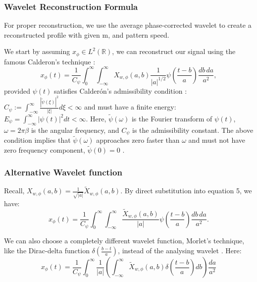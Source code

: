 \documentclass[conference]{IEEEtran}
\begin{document}
\subsubsection{Wavelet Reconstruction Formula}
For proper reconstruction, we use the average phase-corrected wavelet to create a reconstructed profile with given m, and pattern speed. 

We start by assuming $x_{\phi}\in L^2(\mathbb{R})$, we can reconstruct our signal using the famous Calderon's technique \cite{Caldern1964IntermediateSA}\cite{pereyra2012harmonic}\cite{Roy_2022}\cite{APracticalGuidetoWaveletAnalysis}:
\begin{equation}
x_{\phi}(t) = \frac{1}{C_{\psi}} \int_{0}^{\infty} \int_{-\infty}^{\infty} X_{w,\phi}(a,b) \frac{1}{|a|^{1/2}} \psi\left(\frac{t-b}{a}\right) \frac{db \, da}{a^{2}},
\end{equation}
provided $\psi(t)$ satisfies Calderón's admissibility condition \cite{Caldern1964IntermediateSA}: $C_{\psi} := \int_{-\infty}^{\infty} \frac{|\tilde{\psi}(\xi)|^2}{|\xi|} d\xi < \infty$ and must have a finite energy\cite{Roy_2022}\cite{APracticalGuidetoWaveletAnalysis}: $E_{\psi} = \int_{-\infty}^{\infty} |\psi(t)|^2 dt < \infty$. Here, $\tilde\psi(\omega)$ is the Fourier transform of $\psi(t)$, $\omega = 2\pi \mathcal{\beta}$ is the angular frequency, and $C_{\psi}$ is the admissibility constant. The above condition implies that $\tilde\psi(\omega)$ approaches zero faster than $\omega$ and must not have zero frequency component, $\tilde\psi(0)=0$ \cite{Roy_2022}.


\subsubsection{Alternative Wavelet function}
Recall, $X_{w,\phi}(a,b)=\frac{1}{\sqrt{|a|}}\tilde{X}_{w,\phi}(a,b)$. By direct substitution into equation 5, we have:
\begin{equation} 
x_{\phi}(t) = \frac{1}{C_{\psi}} \int_{0}^{\infty} \int_{-\infty}^{\infty}\frac{\tilde{X}_{w,\phi}(a,b)}{|a|} \psi\left(\frac{t-b}{a}\right) \frac{db \, da}{a^{2}}.
\end{equation}



We can also choose a completely different wavelet function, Morlet's technique, like the Dirac-delta function $\delta\left(\frac{b-t}{a}\right)$, instead of the analysing wavelet \cite{doi:10.1146/annurev.fl.24.010192.002143}\cite{Roy_2022}. Here: 
\begin{equation}    x_{\phi}(t) = \frac{1}{C_{\psi}} \int_{0}^{\infty}\frac{1}{|a|} \left(\int_{-\infty}^{\infty} \tilde{X}_{w,\phi}(a,b)\delta\left(\frac{t-b}{a}\right)db\right)\frac{da}{a^2}\end{equation}
\end{document}

